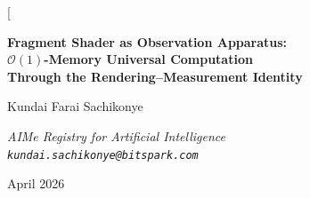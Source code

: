 \documentclass[11pt,twocolumn,a4paper]{article}
\newcommand{\BigO}{\mathcal{O}}
\begin{document}
\twocolumn[
\begin{@twocolumnfalse}
\begin{center}

{\LARGE\bfseries Fragment Shader as Observation Apparatus:\\[4pt]
$\BigO(1)$-Memory Universal Computation\\[4pt]
Through the Rendering--Measurement Identity}

\vspace{12pt}

{\large Kundai Farai Sachikonye}

\vspace{6pt}

{\small\itshape AIMe Registry for Artificial Intelligence \\[0.3em]
\texttt{kundai.sachikonye@bitspark.com}}

\vspace{6pt}

{\small April 2026}

\vspace{14pt}


\end{center}
\end{@twocolumnfalse}
\end{document}
